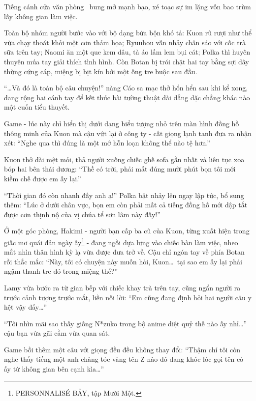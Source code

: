 \documentclass[../main.tex]{subfiles}
\begin{document}
\ct

Tiếng cánh cửa văn phòng \hll\ bung mở mạnh bạo, xé toạc sự im lặng vốn bao trùm lấy không gian làm việc.

Toàn bộ nhóm người bước vào với bộ dạng bừa bộn khó tả: Kuon rũ rượi như thể vừa chạy thoát khỏi một cơn thảm họa; Ryuuhou vẫn nhảy chân sáo với cốc trà sữa trên tay; Naomi ăn một que kem dâu, tà áo lấm lem bụi cát; Polka thì huyên thuyên múa tay giải thích tình hình. Còn Botan bị trói chặt hai tay bằng sợi dây thừng cứng cáp, miệng bị bịt kín bởi một ống tre buộc sau đầu.


``\dots Và đó là toàn bộ câu chuyện!'' nàng Cáo sa mạc thở hổn hển sau khi kể xong, dang rộng hai cánh tay để kết thúc bài tường thuật dài dằng dặc chẳng khác nào một cuốn tiểu thuyết.

Game - lúc này chỉ hiển thị dưới dạng biểu tượng nhỏ trên màn hình đồng hồ thông minh của Kuon mà cậu vứt lại ở công ty - cất giọng lạnh tanh đưa ra nhận xét: ``Nghe qua thì đúng là một mớ hỗn loạn không thể nào tệ hơn.''

Kuon thở dài mệt mỏi, thả người xuống chiếc ghế sofa gần nhất và liên tục xoa bóp hai bên thái dương: ``Thề có trời, phải mất đúng mười phút bọn tôi mới kiềm chế được em ấy lại.''

``Thời gian đó còn nhanh đấy anh ạ!'' Polka bật nhảy lên ngay lập tức, bổ sung thêm: ``Lúc ở dưới chân vực, bọn em còn phải mất cả tiếng đồng hồ mới dập tắt được cơn thịnh nộ của vị chúa tể sơn lâm này đấy!''

Ở một góc phòng, Hakimi - người bạn cấp ba cũ của Kuon, từng xuất hiện trong giấc mơ quái đản ngày ấy\footnote{{\flaregothic PERSONNALISÉ \vnmdisp BẢY}, tập Mười Một.} - đang ngồi dựa lưng vào chiếc bàn làm việc, nheo mắt nhìn thân hình kỳ lạ vừa được đưa trở về. Cậu chỉ ngón tay về phía Botan rồi thắc mắc: ``Này, tôi có chuyện này muốn hỏi, Kuon\dots\ tại sao em ấy lại phải ngậm thanh tre đó trong miệng thế?''

Lamy vừa bước ra từ gian bếp với chiếc khay trà trên tay, cũng ngẩn người ra trước cảnh tượng trước mắt, liền nối lời: ``Em cũng đang định hỏi hai người câu y hệt vậy đấy\dots''

``Tôi nhìn mãi sao thấy giống N*zuko trong bộ anime diệt quỷ thế nào ấy nhỉ\dots'' cậu bạn vừa gãi cằm vừa quan sát.

Game bồi thêm một câu với giọng đều đều không thay đổi: ``Thậm chí tôi còn nghe thấy tiếng một anh chàng tóc vàng tên Z nào đó đang khóc lóc gọi tên cô ấy từ không gian bên cạnh kìa\dots''
\end{document}
